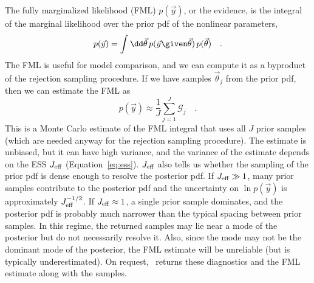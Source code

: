 \documentclass[twocolumn]{AASTeX7/aastex701}
\newcommand{\harv}{\package{harv}}
\begin{document}
The fully marginalized likelihood (FML) $p(\vec{y})$, or the evidence, is the integral
of the marginal likelihood over the prior pdf of the nonlinear parameters,
\begin{equation}
  p(\vec{y}) = \int \dd\vec{\theta} \,p(\vec{y} \given \vec{\theta})\,p(\vec{\theta})
  \quad .
\end{equation}
The FML is useful for model comparison, and we can compute it as a byproduct of the
rejection sampling procedure.
If we have samples $\vec{\theta}_j$ from the prior pdf, then we can estimate the
FML as
\begin{equation}
  p(\vec{y}) \approx \frac{1}{J} \sum_{j=1}^{J} \mathcal{G}_j
  \quad .
\end{equation}
This is a Monte Carlo estimate of the FML integral that uses all $J$ prior samples
(which are needed anyway for the rejection sampling procedure).
The estimate is unbiased, but it can have high variance, and the variance of the
estimate depends on the ESS $J_{\rm eff}$ (Equation~\ref{eq:ess}).
$J_{\rm eff}$ also tells us whether the sampling of the prior pdf is dense enough to
resolve the posterior pdf.
If $J_{\rm eff} \gg 1$, many prior samples contribute to the posterior pdf and the
uncertainty on $\ln p(\vec{y})$ is approximately $J_{\rm eff}^{-1/2}$.
If $J_{\rm eff} \approx 1$, a single prior sample dominates, and the posterior pdf is
probably much narrower than the typical spacing between prior samples.
In this regime, the returned samples may lie near a mode of the posterior but do not
necessarily resolve it.
Also, since the mode may not be the dominant mode of the posterior, the FML estimate
will be unreliable (but is typically underestimated).
On request, \harv\ returns these diagnostics and the FML estimate along with the
samples.
\end{document}
